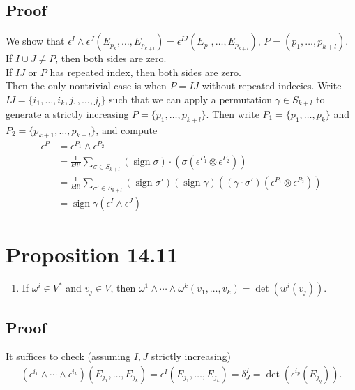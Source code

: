 \documentclass[11pt]{article}
\begin{document}
\subsection*{Proof}
\label{sec:org239bce0}
We show that \(\epsilon^{I}\wedge\epsilon^{J}(E_{p_{k}},\ldots,E_{p_{k+l}})=\epsilon^{IJ}(E_{p_{1}},\ldots,E_{p_{k+l}})\), \(P=(p_{1},\ldots,p_{k+l})\).\\
If \(I\cup J\neq P\), then both sides are zero.\\
If \(IJ\) or \(P\) has repeated index, then both sides are zero.\\
Then the only nontrivial case is when \(P=IJ\) without repeated indecies. Write \(IJ=\{i_{1},\ldots,i_{k},j_{1},\ldots,j_{l}\}\) such that we can apply a permutation \(\gamma\in S_{k+l}\) to generate a strictly increasing \(P=\{p_{1},\ldots,p_{k+l}\}\). Then write \(P_{1}=\{p_{1},\ldots,p_{k}\}\) and \(P_{2}=\{p_{k+1},\ldots,p_{k+l}\}\), and compute\\
\begin{align*}
  \epsilon^{P}
  &=\epsilon^{P_{1}}\wedge\epsilon^{P_{2}} \\
  &=\frac{1}{k!l!}\sum_{\sigma\in S_{k+l}}\left( \operatorname{sign}\sigma \right)\cdot(\sigma(\epsilon^{P_{1}}\otimes\epsilon^{P_{2}})) \\
  &=\frac{1}{k!l!}\sum_{\sigma'\in S_{k+l}}(\operatorname{sign}\sigma')(\operatorname{sign}\gamma)((\gamma\cdot\sigma')(\epsilon^{P_{1}}\otimes\epsilon^{P_{2}})) \\
  &=\operatorname{sign}\gamma(\epsilon^{I}\wedge\epsilon^{J})
\end{align*}
\section*{Proposition 14.11}
\label{sec:org541e187}
\begin{enumerate}
\item If \(\omega^{i}\in V^{*}\) and \(v_{j}\in V\), then \(\omega^{1}\wedge\cdots\wedge\omega^{k}(v_{1},\ldots,v_{k})=\det(w^{i}(v_{j}))\).\\
\end{enumerate}
\subsection*{Proof}
\label{sec:org4c2a111}
It suffices to check (assuming \(I,J\) strictly increasing)\\
\begin{align*}
  (\epsilon^{i_{1}}\wedge\cdots\wedge\epsilon^{i_{k}})(E_{j_{1}},\ldots,E_{j_{k}})
  =\epsilon^{I}(E_{j_{1}},\ldots,E_{j_{k}})
  =\delta^{I}_{J}
  =\det(\epsilon^{i_{p}}(E_{j_{q}})).
\end{align*}
\end{document}

